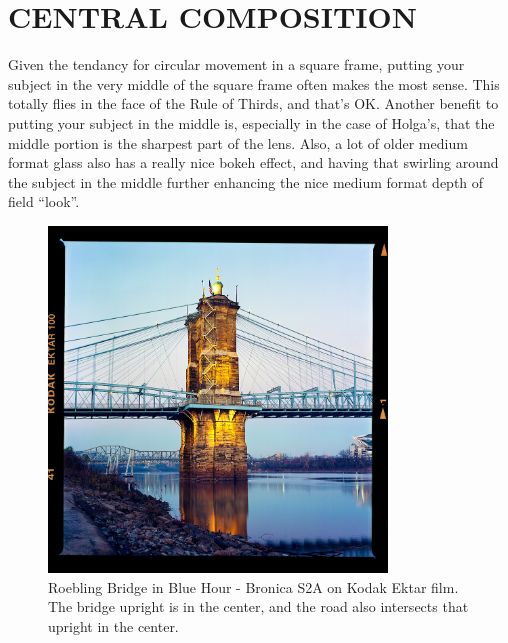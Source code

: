 \documentclass[a4paper]{article}
\begin{document}
\section*{CENTRAL COMPOSITION}
Given the tendancy for circular movement in a square frame, putting your subject in the very middle of the square frame often makes the most sense. This totally flies in the face of the Rule of Thirds, and that’s OK.  Another benefit to putting your subject in the middle is, especially in the case of Holga’s, that the middle portion is the sharpest part of the lens. Also, a lot of older medium format glass also has a really nice bokeh effect, and having that swirling around the subject in the middle further enhancing the nice medium format depth of field “look”.  

\begin{figure}[ht!]
    \centering
    \includegraphics[width=90mm]{img/24999764268_54169a5804_k.jpeg}
    \caption{Roebling Bridge in Blue Hour - Bronica S2A on Kodak Ektar film. The bridge upright is in the center, and the road also intersects that upright in the center.}
\end{figure}
\end{document}
